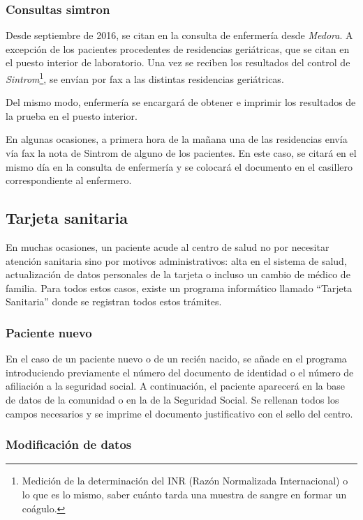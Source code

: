 \subsubsection{Consultas simtron}

Desde septiembre de 2016, se citan en la consulta de enfermería desde \textit{Medora}.
A excepción de los pacientes procedentes de residencias geriátricas, que se citan en el puesto interior de laboratorio.
Una vez se reciben los resultados del control de \textit{Sintrom}\footnote{Medición de la determinación del INR (Razón Normalizada Internacional) o lo que es lo mismo, saber cuánto tarda una muestra de sangre en formar un coágulo.}, se envían por fax a las distintas residencias geriátricas.

Del mismo modo, enfermería se encargará de obtener e imprimir los resultados de la prueba en el puesto interior.

En algunas ocasiones, a primera hora de la mañana una de las residencias envía vía fax la nota de Sintrom de alguno de los pacientes.
En este caso, se citará en el mismo día en la consulta de enfermería y se colocará el documento en el casillero correspondiente al enfermero.

\subsection{Tarjeta sanitaria}

En muchas ocasiones, un paciente acude al centro de salud no por necesitar atención sanitaria sino por motivos administrativos: alta en el sistema de salud, actualización de datos personales de la tarjeta o incluso un cambio de médico de familia. Para todos estos casos, existe un programa informático llamado ``Tarjeta Sanitaria'' donde se registran todos estos trámites.

\subsubsection{Paciente nuevo}

En el caso de un paciente nuevo o de un recién nacido, se añade en el programa introduciendo previamente el número del documento de identidad o el número de afiliación a la seguridad social.
A continuación, el paciente aparecerá en la base de datos de la comunidad o en la de la Seguridad Social.
Se rellenan todos los campos necesarios y se imprime el documento justificativo con el sello del centro.

\subsubsection{Modificación de datos}

